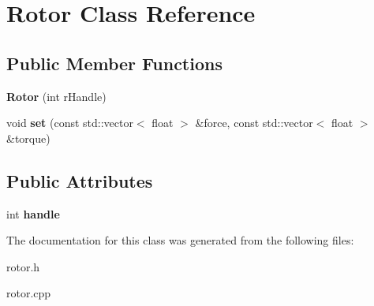 \hypertarget{classRotor}{}\section{Rotor Class Reference}
\label{classRotor}
\subsection*{Public Member Functions}
\begin{DoxyCompactItemize}
\item 
{\bfseries Rotor} (int r\+Handle)\hypertarget{classRotor_ab1ad46cf401db508602fb136f09094c2}{}\label{classRotor_ab1ad46cf401db508602fb136f09094c2}

\item 
void {\bfseries set} (const std\+::vector$<$ float $>$ \&force, const std\+::vector$<$ float $>$ \&torque)\hypertarget{classRotor_aa961955180593d6249b3c35730b29cfb}{}\label{classRotor_aa961955180593d6249b3c35730b29cfb}

\end{DoxyCompactItemize}
\subsection*{Public Attributes}
\begin{DoxyCompactItemize}
\item 
int {\bfseries handle}\hypertarget{classRotor_ae6da9102b10f4759201a62117f6b2b6e}{}\label{classRotor_ae6da9102b10f4759201a62117f6b2b6e}

\end{DoxyCompactItemize}


The documentation for this class was generated from the following files\+:\begin{DoxyCompactItemize}
\item 
rotor.\+h\item 
rotor.\+cpp\end{DoxyCompactItemize}
